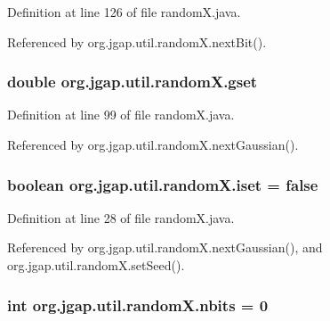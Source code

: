Definition at line 126 of file random\-X.\-java.



Referenced by org.\-jgap.\-util.\-random\-X.\-next\-Bit().

\hypertarget{classorg_1_1jgap_1_1util_1_1random_x_a455672ae37ed072b4f820bfbb0741610}{
\subsubsection[{gset}]{\setlength{\rightskip}{0pt plus 5cm}double org.\-jgap.\-util.\-random\-X.\-gset\hspace{0.3cm}{\ttfamily [private]}}}\label{classorg_1_1jgap_1_1util_1_1random_x_a455672ae37ed072b4f820bfbb0741610}


Definition at line 99 of file random\-X.\-java.



Referenced by org.\-jgap.\-util.\-random\-X.\-next\-Gaussian().

\hypertarget{classorg_1_1jgap_1_1util_1_1random_x_af8cac8df13b9e25cb13d505e3d10ed8e}{
\subsubsection[{iset}]{\setlength{\rightskip}{0pt plus 5cm}boolean org.\-jgap.\-util.\-random\-X.\-iset = false\hspace{0.3cm}{\ttfamily [private]}}}\label{classorg_1_1jgap_1_1util_1_1random_x_af8cac8df13b9e25cb13d505e3d10ed8e}


Definition at line 28 of file random\-X.\-java.



Referenced by org.\-jgap.\-util.\-random\-X.\-next\-Gaussian(), and org.\-jgap.\-util.\-random\-X.\-set\-Seed().

\hypertarget{classorg_1_1jgap_1_1util_1_1random_x_abc44223fc17ec257b1a4514b31ad3211}{
\subsubsection[{nbits}]{\setlength{\rightskip}{0pt plus 5cm}int org.\-jgap.\-util.\-random\-X.\-nbits = 0\hspace{0.3cm}{\ttfamily [private]}}}\label{classorg_1_1jgap_1_1util_1_1random_x_abc44223fc17ec257b1a4514b31ad3211}


